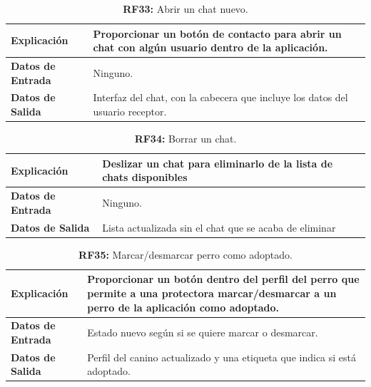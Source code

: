 \documentclass[a4paper, 12pt]{article}
\begin{document}
\begin{table}[H]
\captionsetup{justification=raggedright,singlelinecheck=false}
\caption{\textbf{RF33:} Abrir un chat nuevo.}
\label{tab:RF33}
	\begin{tabular}{|m{5cm}|m{10cm}|}
	\hline
	\textbf{Explicación} & Proporcionar un botón de contacto para abrir un chat con algún usuario dentro de la aplicación. \\ 
	\hline
	\textbf{Datos de Entrada} & Ninguno. \\ 
	\hline
	\textbf{Datos de Salida} & Interfaz del chat, con la cabecera que incluye los datos del usuario receptor. \\ 
	\hline
\end{tabular}
\end{table}

\begin{table}[H]
\captionsetup{justification=raggedright,singlelinecheck=false}
\caption{\textbf{RF34:} Borrar un chat.}
\label{tab:RF34}
	\begin{tabular}{|m{5cm}|m{10cm}|}
	\hline
	\textbf{Explicación} & Deslizar un chat para eliminarlo de la lista de chats disponibles \\ 
	\hline
	\textbf{Datos de Entrada} & Ninguno. \\ 
	\hline
	\textbf{Datos de Salida} & Lista actualizada sin el chat que se acaba de eliminar \\ 
	\hline
\end{tabular}
\end{table}

\begin{table}[H]
\captionsetup{justification=raggedright,singlelinecheck=false}
\caption{\textbf{RF35:} Marcar/desmarcar perro como adoptado.}
\label{tab:RF35}
	\begin{tabular}{|m{5cm}|m{10cm}|}
	\hline
	\textbf{Explicación} & Proporcionar un botón dentro del perfil del perro que permite a una protectora marcar/desmarcar a un perro de la aplicación como adoptado. \\ 
	\hline
	\textbf{Datos de Entrada} & Estado nuevo según si se quiere marcar o desmarcar. \\ 
	\hline
	\textbf{Datos de Salida} & Perfil del canino actualizado y una etiqueta que indica si está adoptado. \\ 
	\hline
\end{tabular}
\end{table}
\end{document}
